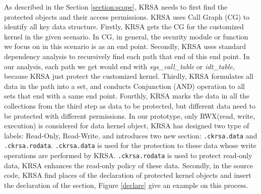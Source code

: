\documentclass[conference]{IEEEtran}
\begin{document}

As described in the Section \ref{section:scope}, KRSA needs to first find the protected objects and their access permissions. 
KRSA uses Call Graph (CG) to identify all key data structure. Firstly, KRSA gets the CG for the customized kernel in the given scenario. In CG, in general, the security module or function we focus on in this scenario is as an end point. Secondly, KRSA uses standard dependency analysis to recursively find each path that end of this end point. In our analysis, each path we get would end with \textit{sys\_call\_table} or \textit{idt\_table}, because KRSA just protect the customized kernel. Thirdly, KRSA formulates all data in the path into a set, and conducts Conjunction (AND) operation to all sets that end with a same end point. Fourthly, KRSA marks the data in all the collections from the third step as data to be protected, but different data need to be protected with different permissions. In our prototype, only RWX(read, write, execution) is considered for data kernel object, KRSA has designed two type of labels: Read-Only, Read-Write, and introduces two new section: \verb|.ckrsa.data| and \verb|.ckrsa.rodata|. \verb|.ckrsa.data| is used for the protection to these data whose write operations are performed by KRSA. \verb|.ckrsa.rodata| is used to protect read-only data, KRSA enhances the read-only policy of these data. Secondly, in the source code, KRSA find places of the declaration of protected kernel objects and insert the declaration of the section, Figure \ref{declare} give an example on this process. 
\end{document}
